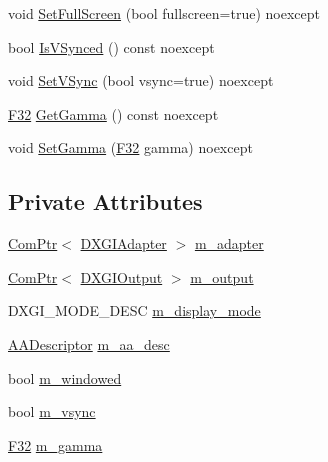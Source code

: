 \begin{DoxyCompactItemize}
void \hyperlink{classmage_1_1rendering_1_1_display_configuration_a5e15cc1ca56718a7892b80cd0a1d20c0}{Set\+Full\+Screen} (bool fullscreen=true) noexcept
\item 
bool \hyperlink{classmage_1_1rendering_1_1_display_configuration_a6447404f1d720b98b37f684ba0e790a0}{Is\+V\+Synced} () const noexcept
\item 
void \hyperlink{classmage_1_1rendering_1_1_display_configuration_a304a29762afd99caa1672ef6cc259fb3}{Set\+V\+Sync} (bool vsync=true) noexcept
\item 
\hyperlink{namespacemage_aa97e833b45f06d60a0a9c4fc22ae02c0}{F32} \hyperlink{classmage_1_1rendering_1_1_display_configuration_a84dec99b487839003fce7c9704dc031d}{Get\+Gamma} () const noexcept
\item 
void \hyperlink{classmage_1_1rendering_1_1_display_configuration_a1d8d4b2f3b79e53d9b36da3f6a0ddf69}{Set\+Gamma} (\hyperlink{namespacemage_aa97e833b45f06d60a0a9c4fc22ae02c0}{F32} gamma) noexcept
\end{DoxyCompactItemize}
\subsection*{Private Attributes}
\begin{DoxyCompactItemize}
\item 
\hyperlink{namespacemage_ae74f374780900893caa5555d1031fd79}{Com\+Ptr}$<$ \hyperlink{namespacemage_1_1rendering_ad55e028ebd705b547eeb972ad8d03b6a}{D\+X\+G\+I\+Adapter} $>$ \hyperlink{classmage_1_1rendering_1_1_display_configuration_a307a8e6e0b1beb93175a6db519759e86}{m\+\_\+adapter}
\item 
\hyperlink{namespacemage_ae74f374780900893caa5555d1031fd79}{Com\+Ptr}$<$ \hyperlink{namespacemage_1_1rendering_aaf22d3893277a4bd8497f6ea69b01532}{D\+X\+G\+I\+Output} $>$ \hyperlink{classmage_1_1rendering_1_1_display_configuration_a3f43cbe5bb1a1a7c1bfb9ce66052fe0a}{m\+\_\+output}
\item 
D\+X\+G\+I\+\_\+\+M\+O\+D\+E\+\_\+\+D\+E\+SC \hyperlink{classmage_1_1rendering_1_1_display_configuration_a577ada006ada1b1e65a8deb817f0dafe}{m\+\_\+display\+\_\+mode}
\item 
\hyperlink{namespacemage_1_1rendering_a25c189fd1da946d7a8f0abdd4f0e6afa}{A\+A\+Descriptor} \hyperlink{classmage_1_1rendering_1_1_display_configuration_ab23ed45b2cfaf05f56389d97ce11109c}{m\+\_\+aa\+\_\+desc}
\item 
bool \hyperlink{classmage_1_1rendering_1_1_display_configuration_a9d2117628e8b8f6a9b6548a9c0b11c36}{m\+\_\+windowed}
\item 
bool \hyperlink{classmage_1_1rendering_1_1_display_configuration_a749335db324a29c8b4ac30acf1c5361d}{m\+\_\+vsync}
\item 
\hyperlink{namespacemage_aa97e833b45f06d60a0a9c4fc22ae02c0}{F32} \hyperlink{classmage_1_1rendering_1_1_display_configuration_ac01844bb757c13e438c9ef3281becd4e}{m\+\_\+gamma}
\end{DoxyCompactItemize}



